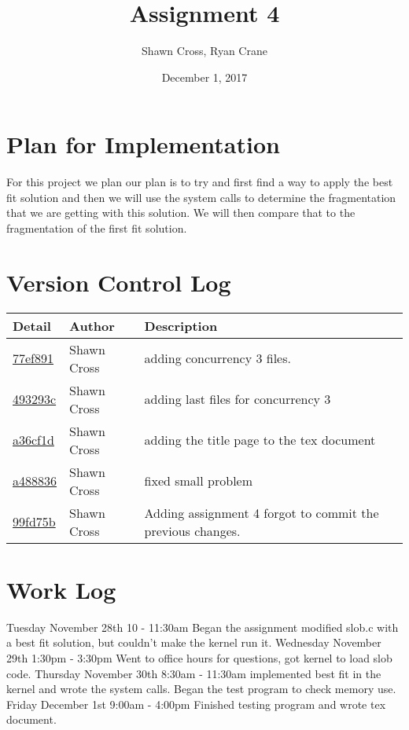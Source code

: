 \documentclass[letterpaper,10pt,titlepage]{article}
\begin{document}
\title{Assignment 4}
\date{December 1, 2017}
\author{Shawn Cross, Ryan Crane}
\maketitle

\section{Plan for Implementation}

For this project we plan our plan is to try and first find a way to apply the 
best fit solution and then we will use the system calls to determine the 
fragmentation that we are getting with this solution. We will then compare 
that to the fragmentation of the first fit solution. 

\section{Version Control Log}
\begin{tabular}{l l l}\textbf{Detail} & \textbf{Author} & \textbf{Description}\\\hline
\href{https://github.com/crosssh/CS444/commit/77ef8915c0518852fc5179cfdcd9d13c765f43b0}{77ef891} & Shawn Cross & adding concurrency 3 files.\\\hline
\href{https://github.com/crosssh/CS444/commit/493293c4ed6f02fa0ae80b534699703d705665b9}{493293c} & Shawn Cross & adding last files for concurrency 3\\\hline
\href{https://github.com/crosssh/CS444/commit/a36cf1d987dc262bd9055c419b370a4d2b430c38}{a36cf1d} & Shawn Cross & adding the title page to the tex document\\\hline
\href{https://github.com/crosssh/CS444/commit/a488836077a629fcc0e9ef43ac11cec51df94038}{a488836} & Shawn Cross & fixed small problem\\\hline
\href{https://github.com/crosssh/CS444/commit/99fd75bdfb7c68d9498469a85f246ba4db9aa885}{99fd75b} & Shawn Cross & Adding assignment 4 forgot to commit the previous changes.\\\hline\end{tabular}

\section{Work Log}
Tuesday November 28th 10 - 11:30am 
Began the assignment modified slob.c with a best fit solution,
but couldn't make the kernel run it.
Wednesday November 29th 1:30pm - 3:30pm
Went to office hours for questions, got kernel to load slob code.
Thursday November 30th 8:30am - 11:30am
implemented best fit in the kernel and wrote the system calls.
Began the test program to check memory use.
Friday December 1st 9:00am - 4:00pm
Finished testing program and wrote tex document.
\end{document}
